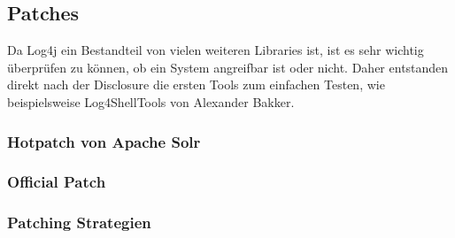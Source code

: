 
\subsection{Patches}\label{subsec:patches}
Da Log4j ein Bestandteil von vielen weiteren Libraries ist, ist es sehr wichtig überprüfen zu können, ob ein System angreifbar ist oder nicht.
Daher entstanden direkt nach der Disclosure die ersten Tools zum einfachen Testen, wie beispielsweise Log4ShellTools von Alexander Bakker.

\subsubsection{Hotpatch von Apache Solr}


\subsubsection{Official Patch}


\subsubsection{Patching Strategien}

